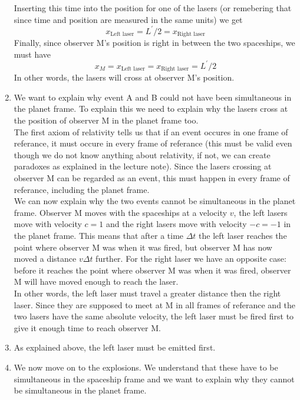 \documentclass[a4paper,10pt,english]{article}
\begin{document}
\begin{enumerate}
Inserting this time into the position for one of the lasers (or remebering that since time and position are measured in the same units) we get 
\[
x_{\text{Left laser}}=L^{\prime}/2=x_{\text{Right laser}}
\]
Finally, since observer M's position is right in between the two spaceships, we must have 
\[
x_{M}=x_{\text{Left laser}}=x_{\text{Right laser}}=L^{\prime}/2
\]
In other words, the lasers will cross at observer M's position.
\item We want to explain why event A and B could not have been simultaneous in the planet frame. To explain this we need to explain why the lasers cross at the position of observer M in the planet frame too. 
\\
The first axiom of relativity tells us that if an event occures in one frame of referance, it must occure in every frame of referance (this must be valid even though we do not know anything about relativity, if not, we can create paradoxes as explained in the lecture note). Since the lasers crossing at observer M can be regarded as an event, this must happen in every frame of referance, including the planet frame. 
\\
We can now explain why the two events cannot be simultaneous in the planet frame. Observer M moves with the spaceships at a velocity $v$, the left lasers move with velocity $c=1$ and the right lasers move with velocity $-c=-1$ in the planet frame. This means that after a time $\Delta t$ the left laser reaches the point where observer M was when it was fired, but observer M has now moved a distance $v\Delta t$ further. For the right laser we have an opposite case: before it reaches the point where observer M was when it was fired, observer M will have moved enough to reach the laser.
\\
In other words, the left laser must travel a greater distance then the right laser. Since they are supposed to meet at M in all frames of referance and the two lasers have the same absolute velocity, the left laser must be fired first to give it enough time to reach observer M.
\item As explained above, the left laser must be emitted first.
\item We now move on to the explosions. We understand that these have to be simultaneous in the spaceship frame and we want to explain why they cannot be simultaneous in the planet frame.
\\

\end{enumerate}
\end{document}
